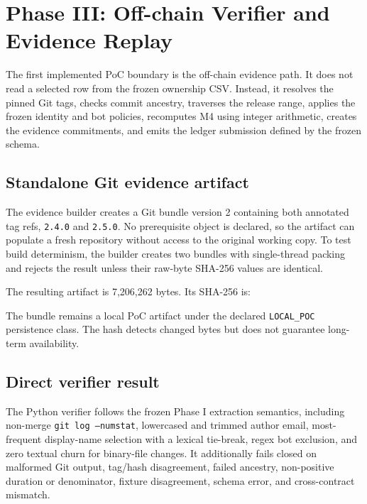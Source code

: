 \section{Phase III: Off-chain Verifier and Evidence Replay}
\label{sec:phase3_offchain_verifier}

The first implemented PoC boundary is the off-chain evidence path. It does not read a selected row from the frozen
ownership CSV. Instead, it resolves the pinned Git tags, checks commit ancestry, traverses the release range, applies the
frozen identity and bot policies, recomputes M4 using integer arithmetic, creates the evidence commitments, and emits the
ledger submission defined by the frozen schema.

\subsection{Standalone Git evidence artifact}
\label{sec:phase3_git_bundle}

The evidence builder creates a Git bundle version 2 containing both annotated tag refs, \texttt{2.4.0} and
\texttt{2.5.0}. No prerequisite object is declared, so the artifact can populate a fresh repository without access to the
original working copy. To test build determinism, the builder creates two bundles with single-thread packing and rejects the
result unless their raw-byte SHA-256 values are identical.

The resulting artifact is 7,206,262 bytes. Its SHA-256 is:

\begin{center}
\scriptsize
{}
\end{center}

The bundle remains a local PoC artifact under the declared \texttt{LOCAL\_POC} persistence class. The hash detects changed
bytes but does not guarantee long-term availability.

\subsection{Direct verifier result}
\label{sec:phase3_verifier_result}

The Python verifier follows the frozen Phase I extraction semantics, including non-merge \texttt{git log --numstat},
lowercased and trimmed author email, most-frequent display-name selection with a lexical tie-break, regex bot exclusion,
and zero textual churn for binary-file changes. It additionally fails closed on malformed Git output, tag/hash disagreement,
failed ancestry, non-positive duration or denominator, fixture disagreement, schema error, and cross-contract mismatch.

